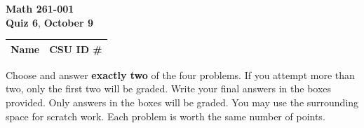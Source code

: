 \documentclass[12pt]{exam}
\newcommand{\class}{Math 261-001}
\newcommand{\examnum}{Quiz 6}
\newcommand{\examdate}{October 9}
\begin{document}
\pagestyle{plain}
\thispagestyle{empty}

\noindent
\textbf{\class}\\
\textbf{\examnum}, \textbf{\examdate}

\setlength{\tabcolsep}{3.5cm}
\renewcommand{\arraystretch}{1.5}
\setlength\extrarowheight{1cm}
\begin{tabular}{ |c|c| }
 \hline
 Name   & CSU ID \#  \\
 \hline
\end{tabular}

\vspace{10pt}

Choose and answer \textbf{exactly two} of the four problems. If you attempt
more than two, only the first two will be graded. Write your final answers
in the boxes provided. Only answers in the boxes will be graded.
You may use the surrounding space for scratch work. Each problem is worth
the same number of points.
\end{document}
